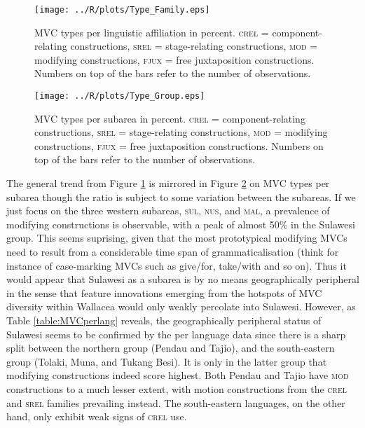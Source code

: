 \begin{figure}
\texttt{[image: ../R/plots/Type\_Family.eps]}
\caption[MVC types per linguistic affiliation in percent]{MVC types per linguistic affiliation in percent. \textsc{crel} = component-relating constructions, \textsc{srel} = stage-relating constructions, \textsc{mod} = modifying constructions, \textsc{fjux} = free juxtaposition constructions. Numbers on top of the bars refer to the number of observations.}\label{fig:type-family}
\end{figure}
\begin{figure}
\texttt{[image: ../R/plots/Type\_Group.eps]}
\caption[MVC types per subarea in percent]{MVC types per subarea in percent. \textsc{crel} = component-relating constructions, \textsc{srel} = stage-relating constructions, \textsc{mod} = modifying constructions, \textsc{fjux} = free juxtaposition constructions. Numbers on top of the bars refer to the number of observations.}\label{fig:type-group6}
\end{figure}


The general trend from Figure \ref{fig:type-family} is mirrored in Figure \ref{fig:type-group6} on MVC types per subarea though the ratio is subject to some variation between the subareas. If we just focus on the three western subareas, \textsc{sul}, \textsc{nus}, and \textsc{mal}, a prevalence of modifying constructions is observable, with a peak of almost 50\% in the Sulawesi group. This seems suprising, given that the most prototypical modifying MVCs need to result from a considerable time span of grammaticalisation (think for instance of case-marking MVCs such as give/for, take/with and so on). Thus it would appear that Sulawesi as a subarea is by no means geographically peripheral in the sense that feature innovations emerging from the hotspots of MVC diversity within Wallacea would only weakly percolate into Sulawesi. However, as Table \ref{table:MVCperlang} reveals, the geographically peripheral status of Sulawesi seems to be confirmed by the per language data since there is a sharp split between the northern group (Pendau and Tajio), and the south-eastern group (Tolaki, Muna, and Tukang Besi). It is only in the latter group that modifying constructions indeed score highest. Both Pendau and Tajio have \textsc{mod} constructions to a much lesser extent, with motion constructions from the \textsc{crel} and \textsc{srel} families prevailing instead. The south-eastern languages, on the other hand, only exhibit weak signs of \textsc{crel} use.

